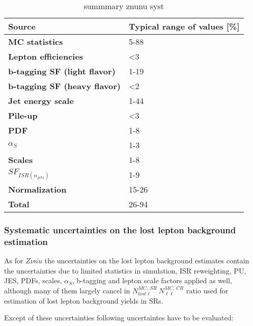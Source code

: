 \begin{table}[h]
\begin{center}
\begin{tabular}{|l|l|}
\hline
\textbf{Source}       & \textbf{Typical range of values} [\%]                       \\
\hline
\textbf{MC statistics}      &  5-88   \\
\hline
\textbf{Lepton efficiencies}              &  <3  \\
\textbf{b-tagging SF (light flavor)}      &  1-19  \\
\textbf{b-tagging SF (heavy flavor)}      &  <2  \\
\textbf{Jet energy scale}                 &  1-44  \\
\textbf{Pile-up}                          &  <3  \\
\hline
\textbf{PDF}                 &  1-8  \\
\textbf{$\alpha_{S}$}                 &  1-3  \\
\textbf{Scales}                 &  1-8  \\
\textbf{$SF_{ISR(n_{jets})}$}                 &  1-9  \\
\textbf{Normalization}                 &  15-26  \\
\hline
\textbf{Total}                 &  26-94  \\
\hline
\end{tabular}
\caption[Table caption text]{summmary znunu syst }
\label{tab:SysZnunuSum}
\end{center}
\end{table}

\subsubsection{Systematic uncertainties on the lost lepton background estimation}

As for $Z \nu \bar{nu}$ the uncertainties on the lost lepton background estimates contain the uncertainties due to limited statistics in simulation, ISR reweighting, PU, JES, PDFs, scales, $\alpha_{S}$, b-tagging and lepton scale factors  applied as well, although many of them largely cancel in $N^{MC,~SR}_{lost \ell}\ N^{MC,~CR}_{\ell\ell}$ ratio used for estimation of lost lepton background yields in SRs.

Except of these uncertainties following uncertaintes have to be evaluated:

